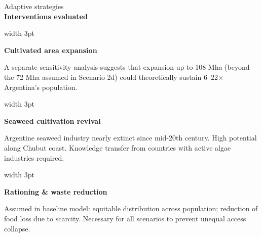 \documentclass[final]{beamer}
\newlength{\fullwidth}           %
\newenvironment{labelblock}[2]{%
  \begin{block}{%
      {\small\color{structure.fg!70!bg}#1}%
      \\[2pt]                                  %
      {\large\bfseries#2}%
      }%
      }{%
  \end{block}%
  }
\begin{document}
\begin{frame}[t]
\begin{columns}[t]
\begin{column}{\fullwidth}
\begin{labelblock}{Adaptive strategies}{Interventions evaluated}
\begin{minipage}[t]{0.22\linewidth}
          \raggedright
          \textcolor{ambermid}{\vrule width 3pt}\hspace{3pt}%
          \begin{minipage}[t]{\dimexpr\linewidth-6pt\relax}
            {\bfseries\small Cultivated area expansion}\par\vspace{2pt}
            {\footnotesize A separate sensitivity analysis suggests that expansion up to 108 Mha (beyond the 72 Mha assumed in Scenario 2d) could theoretically sustain 6–22× Argentina's population.}
          \end{minipage}
        \end{minipage}

        \vspace{6pt}

        \begin{minipage}[t]{0.22\linewidth}
          \raggedright
          \textcolor{tealmid}{\vrule width 3pt}\hspace{3pt}%
          \begin{minipage}[t]{\dimexpr\linewidth-6pt\relax}
            {\bfseries\small Seaweed cultivation revival}\par\vspace{2pt}
            {\footnotesize Argentine seaweed industry nearly extinct since mid-20th
            century. High potential along Chubut coast. Knowledge transfer from
            countries with active algae industries required.}
          \end{minipage}
        \end{minipage}\hfill
        \begin{minipage}[t]{0.22\linewidth}
          \raggedright
          \textcolor{tealmid}{\vrule width 3pt}\hspace{3pt}%
          \begin{minipage}[t]{\dimexpr\linewidth-6pt\relax}
            {\bfseries\small Rationing \& waste reduction}\par\vspace{2pt}
            {\footnotesize Assumed in baseline model: equitable distribution across
            population; reduction of food loss due to scarcity. Necessary for all
            scenarios to prevent unequal access collapse.}
          \end{minipage}
        \end{minipage}\hfill
        \begin{minipage}[t]{0.22\linewidth}

\end{minipage}
\end{labelblock}
\end{column}
\end{columns}
\end{frame}
\end{document}
